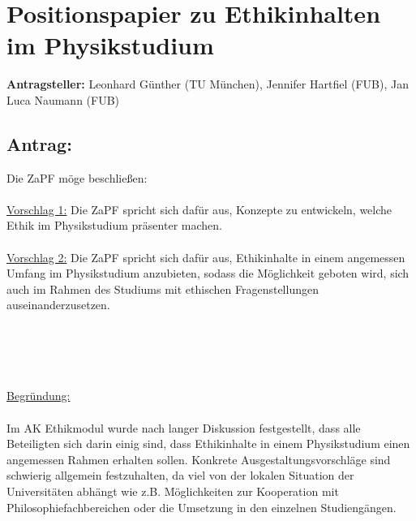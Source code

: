 \documentclass[DIV=9]{scrartcl}
\begin{document}
\section*{Positionspapier zu Ethikinhalten im Physikstudium}

\textbf{Antragsteller:} Leonhard Günther (TU München), Jennifer Hartfiel (FUB), Jan Luca Naumann (FUB)

\subsection*{Antrag:}
Die ZaPF möge beschließen:\\\\

\underline{Vorschlag 1:} Die ZaPF spricht sich dafür aus, Konzepte zu entwickeln, welche Ethik im Physikstudium präsenter machen.\\\\

\underline{Vorschlag 2:} Die ZaPF spricht sich dafür aus, Ethikinhalte in einem angemessen Umfang im Physikstudium anzubieten, sodass die Möglichkeit geboten wird, sich auch im Rahmen des Studiums mit ethischen Fragenstellungen auseinanderzusetzen.

~\\\\\\\\
\underline{Begründung:}\\\\
Im AK Ethikmodul wurde nach langer Diskussion festgestellt, dass alle Beteiligten sich darin einig sind, dass Ethikinhalte in einem Physikstudium einen angemessen Rahmen erhalten sollen. Konkrete Ausgestaltungsvorschläge sind schwierig allgemein festzuhalten, da viel von der lokalen Situation der Universitäten abhängt wie z.B. Möglichkeiten zur Kooperation mit Philosophiefachbereichen oder die Umsetzung in den einzelnen Studiengängen. 
\end{document}
